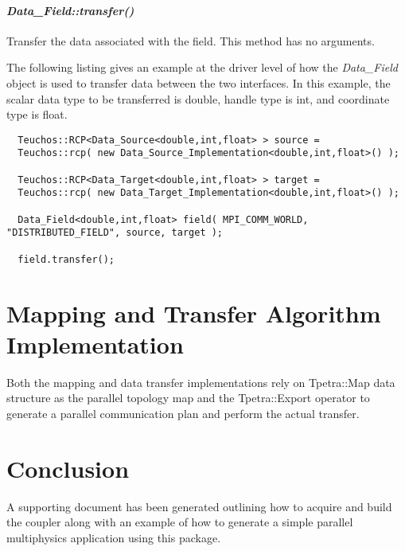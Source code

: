\documentclass[letterpaper]{article}
\begin{document}
\paragraph{\sl Data\_Field::transfer()}
Transfer the data associated with the field. This method has no
arguments. 

The following listing gives an example at the driver level of how the
{\sl Data\_Field} object is used to transfer data between the two
interfaces. In this example, the scalar data type to be transferred is
double, handle type is int, and coordinate type is float.

\begin{lstlisting}
  Teuchos::RCP<Data_Source<double,int,float> > source = 
  Teuchos::rcp( new Data_Source_Implementation<double,int,float>() );

  Teuchos::RCP<Data_Target<double,int,float> > target = 
  Teuchos::rcp( new Data_Target_Implementation<double,int,float>() );

  Data_Field<double,int,float> field( MPI_COMM_WORLD, "DISTRIBUTED_FIELD", source, target ); 

  field.transfer();
\end{lstlisting}

\section{Mapping and Transfer Algorithm Implementation}

Both the mapping and data transfer implementations rely on Tpetra::Map
data structure as the parallel topology map and the Tpetra::Export
operator to generate a parallel communication plan and perform the
actual transfer.

\section{Conclusion}

A supporting document has been generated outlining how to acquire and
build the coupler along with an example of how to generate a simple
parallel multiphysics application using this package.

\pagebreak


\end{document}
